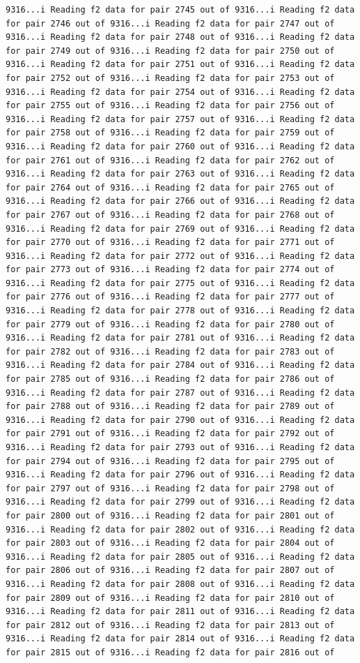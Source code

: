 \documentclass[
]{article}
\begin{document}
\begin{verbatim}
9316...i Reading f2 data for pair 2745 out of 9316...i Reading f2 data for pair 2746 out of 9316...i Reading f2 data for pair 2747 out of 9316...i Reading f2 data for pair 2748 out of 9316...i Reading f2 data for pair 2749 out of 9316...i Reading f2 data for pair 2750 out of 9316...i Reading f2 data for pair 2751 out of 9316...i Reading f2 data for pair 2752 out of 9316...i Reading f2 data for pair 2753 out of 9316...i Reading f2 data for pair 2754 out of 9316...i Reading f2 data for pair 2755 out of 9316...i Reading f2 data for pair 2756 out of 9316...i Reading f2 data for pair 2757 out of 9316...i Reading f2 data for pair 2758 out of 9316...i Reading f2 data for pair 2759 out of 9316...i Reading f2 data for pair 2760 out of 9316...i Reading f2 data for pair 2761 out of 9316...i Reading f2 data for pair 2762 out of 9316...i Reading f2 data for pair 2763 out of 9316...i Reading f2 data for pair 2764 out of 9316...i Reading f2 data for pair 2765 out of 9316...i Reading f2 data for pair 2766 out of 9316...i Reading f2 data for pair 2767 out of 9316...i Reading f2 data for pair 2768 out of 9316...i Reading f2 data for pair 2769 out of 9316...i Reading f2 data for pair 2770 out of 9316...i Reading f2 data for pair 2771 out of 9316...i Reading f2 data for pair 2772 out of 9316...i Reading f2 data for pair 2773 out of 9316...i Reading f2 data for pair 2774 out of 9316...i Reading f2 data for pair 2775 out of 9316...i Reading f2 data for pair 2776 out of 9316...i Reading f2 data for pair 2777 out of 9316...i Reading f2 data for pair 2778 out of 9316...i Reading f2 data for pair 2779 out of 9316...i Reading f2 data for pair 2780 out of 9316...i Reading f2 data for pair 2781 out of 9316...i Reading f2 data for pair 2782 out of 9316...i Reading f2 data for pair 2783 out of 9316...i Reading f2 data for pair 2784 out of 9316...i Reading f2 data for pair 2785 out of 9316...i Reading f2 data for pair 2786 out of 9316...i Reading f2 data for pair 2787 out of 9316...i Reading f2 data for pair 2788 out of 9316...i Reading f2 data for pair 2789 out of 9316...i Reading f2 data for pair 2790 out of 9316...i Reading f2 data for pair 2791 out of 9316...i Reading f2 data for pair 2792 out of 9316...i Reading f2 data for pair 2793 out of 9316...i Reading f2 data for pair 2794 out of 9316...i Reading f2 data for pair 2795 out of 9316...i Reading f2 data for pair 2796 out of 9316...i Reading f2 data for pair 2797 out of 9316...i Reading f2 data for pair 2798 out of 9316...i Reading f2 data for pair 2799 out of 9316...i Reading f2 data for pair 2800 out of 9316...i Reading f2 data for pair 2801 out of 9316...i Reading f2 data for pair 2802 out of 9316...i Reading f2 data for pair 2803 out of 9316...i Reading f2 data for pair 2804 out of 9316...i Reading f2 data for pair 2805 out of 9316...i Reading f2 data for pair 2806 out of 9316...i Reading f2 data for pair 2807 out of 9316...i Reading f2 data for pair 2808 out of 9316...i Reading f2 data for pair 2809 out of 9316...i Reading f2 data for pair 2810 out of 9316...i Reading f2 data for pair 2811 out of 9316...i Reading f2 data for pair 2812 out of 9316...i Reading f2 data for pair 2813 out of 9316...i Reading f2 data for pair 2814 out of 9316...i Reading f2 data for pair 2815 out of 9316...i Reading f2 data for pair 2816 out of 
\end{verbatim}
\end{document}

